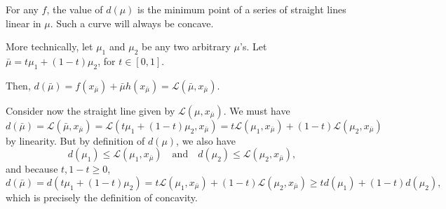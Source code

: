 \documentclass{article}[a4paper]
\begin{document}
\begin{enumerate}[label=(\alph*), ref=3.\alph*]
        For any $f$, the value of $d\left( \mu \right)$ is the minimum point of a series of straight lines linear in $\mu$. Such a curve will always be concave.

        More technically, let $\mu_1$ and $\mu_2$ be any two arbitrary $\mu$'s. Let $\bar{\mu} = t \mu_1 + \left( 1 - t\right) \mu_2$, for $t \in \left[ 0, 1\right]$.

        Then, $d\left( \bar{\mu }\right) = f\left( x_{\bar{\mu }} \right) + \bar{\mu} h\left( x_{\bar{\mu}} \right) = \mathcal{L}\left( \bar{\mu}, x_{\bar{\mu}} \right)$.
        
        Consider now the straight line given by $\mathcal{L}\left( \mu, x_{\bar{\mu}} \right)$. We must have \[
            d\left( \bar{\mu} \right)
            =
            \mathcal{L}\left( \bar{\mu}, x_{\bar{\mu}} \right)
            =
            \mathcal{L}\left( t \mu_1 + \left( 1 - t\right) \mu_2, x_{\bar{\mu}} \right)
            =
            t \mathcal{L}\left( \mu_1, x_{\bar{\mu}} \right)
            +
            \left( 1 - t \right) \mathcal{L}\left( \mu_2, x_{\bar{\mu}} \right)
        \] by linearity. But by definition of $d\left( \mu \right)$, we also have \[
            d\left( \mu_1 \right) \leq \mathcal{L}\left( \mu_1, x_{\bar{\mu}} \right)
            \quad
            \text{and}
            \quad
            d\left( \mu_2 \right) \leq \mathcal{L}\left( \mu_2, x_{\bar{\mu}} \right),
        \] and because $t, 1 - t \geq 0$, \[
            d\left( \bar{\mu} \right)
            =
            d\left( t \mu_1 + \left( 1 - t\right) \mu_2 \right)
            =
            t \mathcal{L}\left( \mu_1, x_{\bar{\mu}} \right)
            +
            \left( 1 - t \right) \mathcal{L}\left( \mu_2, x_{\bar{\mu}} \right)
            \geq
            t d\left( \mu_1 \right)
            +
            \left( 1 - t \right) d\left( \mu_2 \right),
        \] which is precisely the definition of concavity.
    \end{enumerate}
\end{document}
